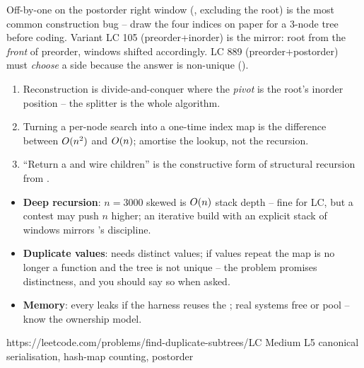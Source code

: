 \begin{warningbox}
Off-by-one on the postorder right window (, excluding the root) is the most
common construction bug -- draw the four indices on paper for a 3-node tree before coding.
Variant LC 105 (preorder+inorder) is the mirror: root from the \emph{front} of preorder,
windows shifted accordingly. LC 889 (preorder+postorder) must \emph{choose} a side because
the answer is non-unique ().
\end{warningbox}

\begin{insightbox}
\begin{enumerate}[nosep, leftmargin=1.6em]
  \item Reconstruction is divide-and-conquer where the \emph{pivot} is the root's inorder
        position -- the splitter is the whole algorithm.
  \item Turning a per-node search into a one-time index map is the difference between
        $O(n^2)$ and $O(n)$; amortise the lookup, not the recursion.
  \item ``Return a  and wire children'' is the constructive form of
        structural recursion from .
\end{enumerate}
\end{insightbox}

\begin{hardeningbox}
\begin{itemize}[nosep, leftmargin=1.4em]
  \item \textbf{Deep recursion}: $n=3000$ skewed is $O(n)$ stack depth -- fine for LC,
        but a contest may push $n$ higher; an iterative build with an explicit stack of
        windows mirrors 's discipline.
  \item \textbf{Duplicate values}:  needs distinct values; if
        values repeat the map is no longer a function and the tree is not unique -- the
        problem promises distinctness, and you should say so when asked.
  \item \textbf{Memory}: every  leaks if the harness reuses the
        ; real systems free or pool -- know the ownership model.
\end{itemize}
\end{hardeningbox}

  {https://leetcode.com/problems/find-duplicate-subtrees/}{LC Medium L5}
  {canonical serialisation, hash-map counting, postorder}

